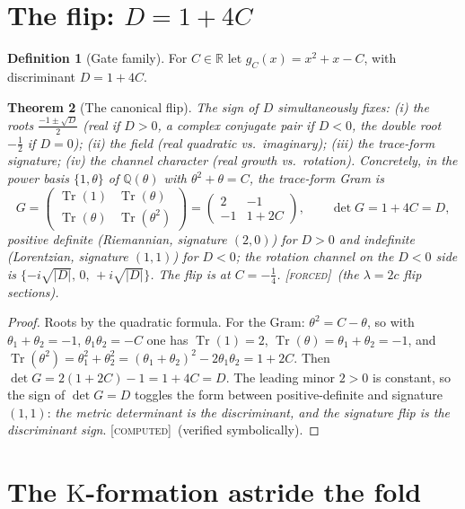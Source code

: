 \documentclass[11pt]{article}
\theoremstyle{plain}
\newtheorem{theorem}{Theorem}[section]
\theoremstyle{definition}
\newtheorem{definition}[theorem]{Definition}
\theoremstyle{remark}
\newcommand{\forced}{\textup{\textcolor{forcedc}{\textsc{[forced]}}}}
\newcommand{\computed}{\textup{\textcolor{forcedc}{\textsc{[computed]}}}}
\newcommand{\R}{\mathbb{R}}
\newcommand{\Q}{\mathbb{Q}}
\newcommand{\tr}{\operatorname{Tr}}
\newcommand{\abs}[1]{\left\lvert #1 \right\rvert}
\newcommand{\Kf}{\mathrm{K}}
\begin{document}
\section{The flip: $D=1+4C$}\label{sec:flip}

\begin{definition}[Gate family]\label{def:gate}
For $C\in\R$ let $g_C(x)=x^2+x-C$, with discriminant $D=1+4C$.
\end{definition}

\begin{theorem}[The canonical flip]\label{thm:flip}
The sign of $D$ simultaneously fixes: (i) the roots $\tfrac{-1\pm\sqrt D}{2}$ (real if $D>0$, a complex
conjugate pair if $D<0$, the double root $-\tfrac12$ if $D=0$); (ii) the field (real quadratic vs.\
imaginary); (iii) the trace-form signature; (iv) the channel character (real \emph{growth} vs.\
\emph{rotation}). Concretely, in the power basis $\{1,\theta\}$ of $\Q(\theta)$ with $\theta^2+\theta=C$,
the trace-form Gram is
\begin{equation}\label{eq:gram}
G=\begin{pmatrix}\tr(1)&\tr(\theta)\\\tr(\theta)&\tr(\theta^2)\end{pmatrix}
=\begin{pmatrix}2&-1\\-1&1+2C\end{pmatrix},\qquad \det G = 1+4C = D,
\end{equation}
positive definite (Riemannian, signature $(2,0)$) for $D>0$ and indefinite (Lorentzian, signature $(1,1)$)
for $D<0$; the rotation channel on the $D<0$ side is $\{-i\sqrt{\abs D},\,0,\,+i\sqrt{\abs D}\}$. The flip
is at $C=-\tfrac14$. \forced\ (the $\lambda=2c$ flip sections).
\end{theorem}
\begin{proof}
Roots by the quadratic formula. For the Gram: $\theta^2=C-\theta$, so with $\theta_1+\theta_2=-1$,
$\theta_1\theta_2=-C$ one has $\tr(1)=2$, $\tr(\theta)=\theta_1+\theta_2=-1$, and
$\tr(\theta^2)=\theta_1^2+\theta_2^2=(\theta_1+\theta_2)^2-2\theta_1\theta_2=1+2C$. Then
$\det G=2(1+2C)-1=1+4C=D$. The leading minor $2>0$ is constant, so the sign of $\det G=D$ toggles the form
between positive-definite and signature $(1,1)$: \emph{the metric determinant is the discriminant, and the
signature flip is the discriminant sign}. \computed\ (verified symbolically).
\end{proof}

\section{The $\Kf$-formation astride the fold}\label{sec:kform}
\end{document}
